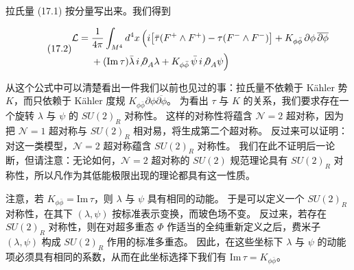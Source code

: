 
拉氏量 (17.1) 按分量写出来。我们得到

\begin{equation}
  \tag{17.2}
  \label{eq:17-2}
  \begin{aligned}
  \mathcal{L}={}&\frac{1}{4\pi}\int_{M^4}d^4x\,\Bigl(i\bigl[\bar\tau(F^+\wedge F^+)-\tau(F^-\wedge F^-)\bigr]
  +K_{\phi\bar\phi}\,\partial\phi\,\overline{\partial\phi}\\
  &+(\mathrm{Im}\,\tau)\bar\lambda\,i{\not\partial}_{A}\lambda
  +K_{\phi\bar\phi}\,\bar\psi\,i{\not\partial}_{A}\psi\Bigr)
  \end{aligned}
\end{equation}

从这个公式中可以清楚看出一件我们以前也见过的事：拉氏量不依赖于 Kähler 势 $K$，而只依赖于 Kähler 度规 $K_{\phi\bar\phi}\partial\phi\overline{\partial\phi}$。
为看出 $\tau$ 与 $K$ 的关系，我们要求存在一个旋转 $\lambda$ 与 $\psi$ 的 $SU(2)_R$ 对称性。
这样的对称性将蕴含 $\mathcal{N}=2$ 超对称，因为把 $\mathcal{N}=1$ 超对称与 $SU(2)_R$ 相对易，将生成第二个超对称。
反过来可以证明：对这一类模型，$\mathcal{N}=2$ 超对称蕴含 $SU(2)_R$ 对称性。
我们在此不证明后一论断，但请注意：无论如何，$\mathcal{N}=2$ 超对称的 $SU(2)$ 规范理论具有 $SU(2)_R$ 对称性，所以凡作为其低能极限出现的理论都具有这一性质。


注意，若 $K_{\phi\bar\phi}=\mathrm{Im}\,\tau$，则 $\lambda$ 与 $\psi$ 具有相同的动能。
于是可以定义一个 $SU(2)_R$ 对称性，在其下 $(\lambda,\psi)$ 按标准表示变换，而玻色场不变。
反过来，若存在 $SU(2)_R$ 对称性，则在对超多重态 $\Phi$ 作适当的全纯重新定义之后，费米子 $(\lambda,\psi)$ 构成 $SU(2)_R$ 作用的标准多重态。
因此，在这些坐标下 $\lambda$ 与 $\psi$ 的动能项必须具有相同的系数，从而在此坐标选择下我们有 $\mathrm{Im}\,\tau=K_{\phi\bar\phi}$。

